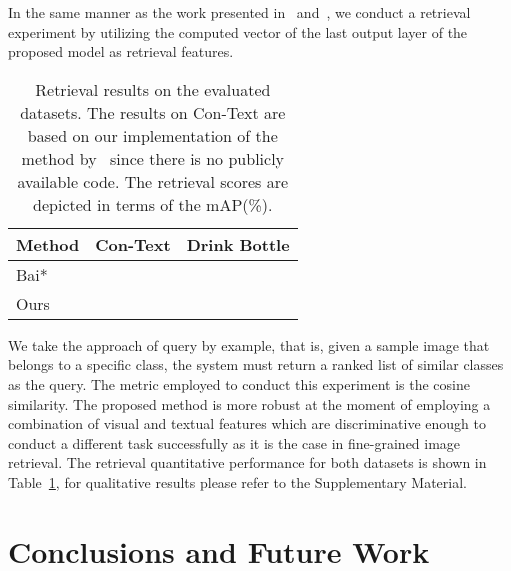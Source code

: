 \documentclass[10pt,twocolumn,letterpaper]{article}
\begin{document}
In the same manner as the work presented in~\cite{karaoglu2017words} and~\cite{bai2018integrating}, we conduct a retrieval experiment by utilizing the computed vector of the last output layer of the proposed model as retrieval features. 
\begin{table}[H]
\begin{center}
\begin{tabular}{l|ll}
             \textbf{Method} & \textbf{Con-Text} & \textbf{Drink Bottle} \\ \hline
Bai*\cite{bai2018integrating}  &                 &                  \\
Ours & \boldmath            & \boldmath                
\end{tabular}
\end{center}
\caption{Retrieval results on the evaluated datasets. The results on Con-Text are based on our implementation of the method by~\cite{bai2018integrating} since there is no publicly available code. The retrieval scores are depicted in terms of the mAP(\%).}
\label{tab:retrieval_results}
\end{table}
We take the approach of query by example, that is, given a sample image that belongs to a specific class, the system must return a ranked list of similar classes as the query. The metric employed to conduct this experiment is the cosine similarity.
The proposed method is more robust at the moment of employing a combination of visual and textual features which are discriminative enough to conduct a different task successfully as it is the case in fine-grained image retrieval. The retrieval quantitative performance for both datasets is shown in Table~\ref{tab:retrieval_results}, for qualitative results please refer to the Supplementary Material.
\section{Conclusions and Future Work}
\label{sec:Conclusions}
\end{document}
